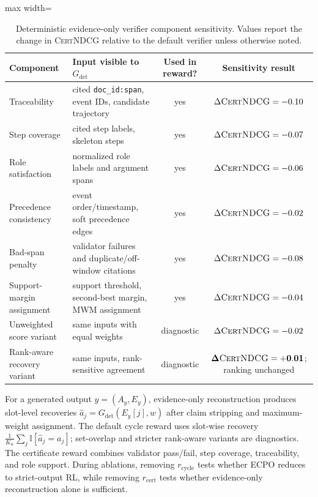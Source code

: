 \documentclass{article}
\newcommand{\CertNDCG}{\textsc{CertNDCG}}
\newcommand{\Gdet}{G_{\mathrm{det}}}
\begin{document}
\begin{table}[h]
\centering
\caption{Deterministic evidence-only verifier component sensitivity. Values report the change in \CertNDCG{} relative to the default verifier unless otherwise noted.}
\label{tab:det_verifier_components}
\small
\begin{adjustbox}{max width=\linewidth}
\begin{tabular}{l l c c}
\toprule
Component & Input visible to $\Gdet$ & Used in reward? & Sensitivity result \\
\midrule
Traceability & cited \texttt{doc\_id:span}, event IDs, candidate trajectory & yes & $\Delta\CertNDCG=-0.10$ \\
Step coverage & cited step labels, skeleton steps & yes & $\Delta\CertNDCG=-0.07$ \\
Role satisfaction & normalized role labels and argument spans & yes & $\Delta\CertNDCG=-0.06$ \\
Precedence consistency & event order/timestamp, soft precedence edges & yes & $\Delta\CertNDCG=-0.02$ \\
Bad-span penalty & validator failures and duplicate/off-window citations & yes & $\Delta\CertNDCG=-0.08$ \\
Support-margin assignment & support threshold, second-best margin, MWM assignment & yes & $\Delta\CertNDCG=-0.04$ \\
Unweighted score variant & same inputs with equal weights & diagnostic & $\Delta\CertNDCG=-0.02$ \\
Rank-aware recovery variant & same inputs, rank-sensitive agreement & diagnostic & $\mathbf{\Delta\CertNDCG=+0.01}$; ranking unchanged \\
\bottomrule
\end{tabular}
\end{adjustbox}
\end{table}

For a generated output $y=(A_y,E_y)$, evidence-only reconstruction produces slot-level recoveries $\hat a_j=\Gdet(E_y[j],w)$ after claim stripping and maximum-weight assignment. The default cycle reward uses slot-wise recovery $\frac{1}{K_w}\sum_j\mathbb{I}[\hat a_j=a_j]$; set-overlap and stricter rank-aware variants are diagnostics. The certificate reward combines validator pass/fail, step coverage, traceability, and role support. During ablations, removing $r_{\mathrm{cycle}}$ tests whether ECPO reduces to strict-output RL, while removing $r_{\mathrm{cert}}$ tests whether evidence-only reconstruction alone is sufficient.
\end{document}
